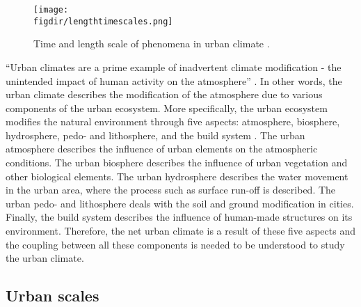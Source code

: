 \begin{figure}[p]
	\centering
	\texttt{[image: \\figdir/lengthtimescales.png]}
	\caption{Time and length scale of phenomena in urban climate \citep{Oke2017a}.}
	\label{fig:lengthtimescales}
\end{figure}


``Urban climates are a prime example of inadvertent climate modification - the unintended impact of human activity on the atmosphere'' \citep{Oke2017a}. In other words, the urban climate describes the modification of the atmosphere due to various components of the urban ecosystem. More specifically, the urban ecosystem modifies the natural environment through five aspects: atmosphere, biosphere, hydrosphere, pedo- and lithosphere, and the build system \citep{Oke2017a}. The urban atmosphere describes the influence of urban elements on the atmospheric conditions. The urban biosphere describes the influence of urban vegetation and other biological elements. The urban hydrosphere describes the water movement in the urban area, where the process such as surface run-off is described. The urban pedo- and lithosphere deals with the soil and ground modification in cities. Finally, the build system describes the influence of human-made structures on its environment. Therefore, the net urban climate is a result of these five aspects and the coupling between all these components is needed to be understood to study the urban climate.




\subsection{Urban scales}

